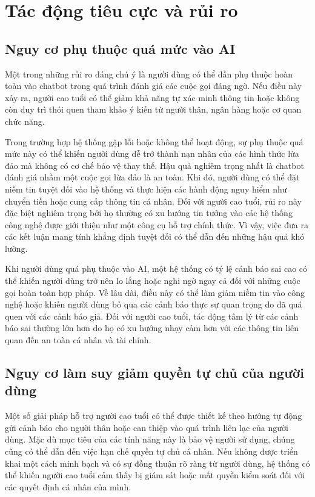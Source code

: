 \section{Tác động tiêu cực và rủi ro}
\subsection{Nguy cơ phụ thuộc quá mức vào AI}
Một trong những rủi ro đáng chú ý là người dùng có thể dần phụ thuộc hoàn toàn vào chatbot trong quá trình đánh giá các cuộc gọi đáng ngờ. Nếu điều này xảy ra, người cao tuổi có thể giảm khả năng tự xác minh thông tin hoặc không còn duy trì thói quen tham khảo ý kiến từ người thân, ngân hàng hoặc cơ quan chức năng.

Trong trường hợp hệ thống gặp lỗi hoặc không thể hoạt động, sự phụ thuộc quá mức này có thể khiến người dùng dễ trở thành nạn nhân của các hình thức lừa đảo mà không có cơ chế bảo vệ thay thế. Hậu quả nghiêm trọng nhất là chatbot đánh giá nhầm một cuộc gọi lừa đảo là an toàn. Khi đó, người dùng có thể đặt niềm tin tuyệt đối vào hệ thống và thực hiện các hành động nguy hiểm như chuyển tiền hoặc cung cấp thông tin cá nhân.
Đối với người cao tuổi, rủi ro này đặc biệt nghiêm trọng bởi họ thường có xu hướng tin tưởng vào các hệ thống công nghệ được giới thiệu như một công cụ hỗ trợ chính thức. Vì vậy, việc đưa ra các kết luận mang tính khẳng định tuyệt đối có thể dẫn đến những hậu quả khó lường.

Khi người dùng quá phụ thuộc vào AI, một hệ thống có tỷ lệ cảnh báo sai cao có thể khiến người dùng trở nên lo lắng hoặc nghi ngờ ngay cả đối với những cuộc gọi hoàn toàn hợp pháp. Về lâu dài, điều này có thể làm giảm niềm tin vào công nghệ hoặc khiến người dùng bỏ qua các cảnh báo thực sự quan trọng do đã quá quen với các cảnh báo giả.
Đối với người cao tuổi, tác động tâm lý từ các cảnh báo sai thường lớn hơn do họ có xu hướng nhạy cảm hơn với các thông tin liên quan đến an toàn cá nhân và tài chính.

\subsection{Nguy cơ làm suy giảm quyền tự chủ của người dùng}
Một số giải pháp hỗ trợ người cao tuổi có thể được thiết kế theo hướng tự động gửi cảnh báo cho người thân hoặc can thiệp vào quá trình liên lạc của người dùng. Mặc dù mục tiêu của các tính năng này là bảo vệ người sử dụng, chúng cũng có thể dẫn đến việc hạn chế quyền tự chủ cá nhân.
Nếu không được triển khai một cách minh bạch và có sự đồng thuận rõ ràng từ người dùng, hệ thống có thể khiến người cao tuổi cảm thấy bị giám sát hoặc mất quyền kiểm soát đối với các quyết định cá nhân của mình.

